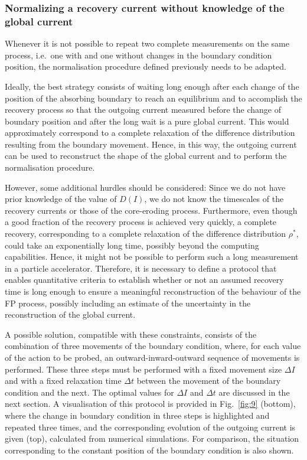 {%

\subsubsection{Normalizing a recovery current without knowledge of the global current}


Whenever it is not possible to repeat two complete measurements on the same process, i.e.\ one with and one without changes in the boundary condition position, the normalisation procedure defined previously needs to be adapted.

Ideally, the best strategy consists of waiting long enough after each change of the position of the absorbing boundary to reach an equilibrium and to accomplish the recovery process so that the outgoing current measured before the change of boundary position and after the long wait is a pure global current. This would approximately correspond to a complete relaxation of the difference distribution resulting from the boundary movement. Hence, in this way, the outgoing current can be used to reconstruct the shape of the global current and to perform the normalisation procedure.

However, some additional hurdles should be considered: Since we do not have prior knowledge of the value of $D(I)$, we do not know the timescales of the recovery currents or those of the core-eroding process. Furthermore, even though a good fraction of the recovery process is achieved very quickly, a complete recovery, corresponding to a complete relaxation of the difference distribution $\rho^\ast$, could take an exponentially long time, possibly beyond the computing capabilities. Hence, it might not be possible to perform such a long measurement in a particle accelerator. Therefore, it is necessary to define a protocol that enables quantitative criteria to establish whether or not an assumed recovery time is long enough to ensure a meaningful reconstruction of the behaviour of the FP process, possibly including an estimate of the uncertainty in the reconstruction of the global current.

A possible solution, compatible with these constraints, consists of the combination of three movements of the boundary condition, where, for each value of the action to be probed, an outward-inward-outward sequence of movements is performed. These three steps must be performed with a fixed movement size $\Delta I$ and with a fixed relaxation time $\Delta t$ between the movement of the boundary condition and the next. The optimal values for $\Delta I$ and $\Delta t$ are discussed in the next section. A visualisation of this protocol is provided in Fig.~\ref{fig:9} (bottom), where the change in boundary condition in three steps is highlighted and repeated three times, and the corresponding evolution of the outgoing current is given (top), calculated from numerical simulations. For comparison, the situation corresponding to the constant position of the boundary condition is also shown.

}
